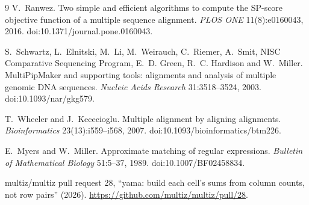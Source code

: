 \documentclass[11pt,letterpaper]{article}
\begin{document}
\begin{thebibliography}{9}
 V.~Ranwez. Two simple and efficient algorithms to compute the SP-score objective function of a
multiple sequence alignment. \emph{PLOS ONE} 11(8):e0160043, 2016. doi:10.1371/journal.pone.0160043.

 S.~Schwartz, L.~Elnitski, M.~Li, M.~Weirauch, C.~Riemer, A.~Smit, NISC Comparative Sequencing
Program, E.~D. Green, R.~C. Hardison and W.~Miller. MultiPipMaker and supporting tools: alignments and analysis of
multiple genomic DNA sequences. \emph{Nucleic Acids Research} 31:3518--3524, 2003. doi:10.1093/nar/gkg579.

 T.~Wheeler and J.~Kececioglu. Multiple alignment by aligning alignments.
\emph{Bioinformatics} 23(13):i559--i568, 2007. doi:10.1093/bioinformatics/btm226.

 E.~Myers and W.~Miller. Approximate matching of regular expressions. \emph{Bulletin of
Mathematical Biology} 51:5--37, 1989. doi:10.1007/BF02458834.

 multiz/multiz pull request 28, ``yama: build each cell's sums from column counts, not row pairs''
(2026). \url{https://github.com/multiz/multiz/pull/28}.

\end{thebibliography}
\end{document}
